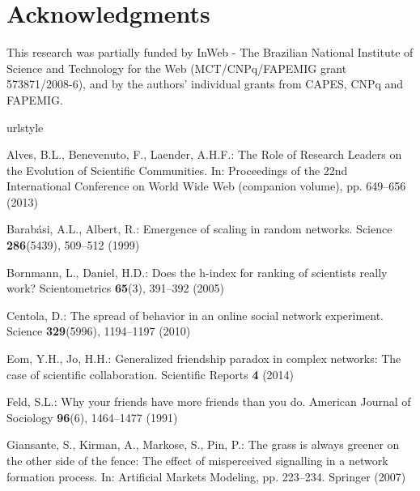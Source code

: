 \documentclass[smallextended]{svjour3}
\begin{document}
\section{Acknowledgments}
This research was partially funded by InWeb - The Brazilian National Institute of Science and Technology for the Web (MCT/CNPq/FAPEMIG grant 573871/2008-6), and by the authors' individual grants from CAPES, CNPq and FAPEMIG.




\begin{thebibliography}{10}
\providecommand{\url}[1]{{#1}}
\providecommand{\urlprefix}{URL }
\expandafter\ifx\csname urlstyle\endcsname\relax
  \providecommand{\doi}[1]{DOI~\discretionary{}{}{}#1}\else
  \providecommand{\doi}{DOI~\discretionary{}{}{}\begingroup
  \urlstyle{rm}\Url}\fi

Alves, B.L., Benevenuto, F., Laender, A.H.F.: {The Role of Research Leaders on
  the Evolution of Scientific Communities}.
\newblock In: Proceedings of the 22nd International Conference on World Wide
  Web (companion volume), pp. 649--656 (2013)

Barab{\'a}si, A.L., Albert, R.: Emergence of scaling in random networks.
\newblock Science \textbf{286}(5439), 509--512 (1999)

Bornmann, L., Daniel, H.D.: Does the h-index for ranking of scientists really
  work?
\newblock Scientometrics \textbf{65}(3), 391--392 (2005)

Centola, D.: The spread of behavior in an online social network experiment.
\newblock Science \textbf{329}(5996), 1194--1197 (2010)

Eom, Y.H., Jo, H.H.: Generalized friendship paradox in complex networks: The
  case of scientific collaboration.
\newblock Scientific Reports \textbf{4} (2014)

Feld, S.L.: Why your friends have more friends than you do.
\newblock American Journal of Sociology \textbf{96}(6), 1464--1477 (1991)

Giansante, S., Kirman, A., Markose, S., Pin, P.: The grass is always greener on
  the other side of the fence: The effect of misperceived signalling in a
  network formation process.
\newblock In: Artificial Markets Modeling, pp. 223--234. Springer (2007)


\end{thebibliography}
\end{document}
